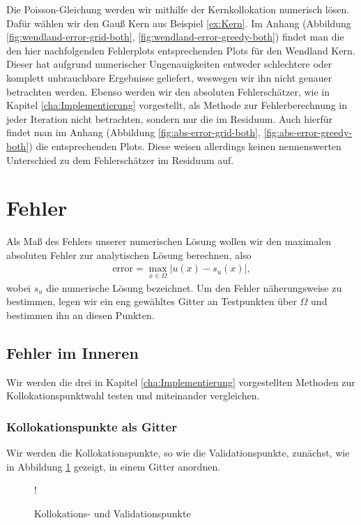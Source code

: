 Die Poisson-Gleichung werden wir mithilfe der Kernkollokation numerisch lösen. Dafür wählen wir den Gauß Kern aus Beispiel \ref{ex:Kern}. Im Anhang (Abbildung \ref{fig:wendland-error-grid-both}, \ref{fig:wendland-error-greedy-both}) findet man die den hier nachfolgenden Fehlerplots entsprechenden Plots für den Wendland Kern. Dieser hat aufgrund numerischer Ungenauigkeiten entweder schlechtere oder komplett unbrauchbare Ergebnisse geliefert, weswegen wir ihn nicht genauer betrachten werden. Ebenso werden wir den absoluten Fehlerschätzer, wie in Kapitel \ref{cha:Implementierung} vorgestellt, als Methode zur Fehlerberechnung in jeder Iteration nicht betrachten, sondern nur die im Residuum. Auch hierfür findet man im Anhang (Abbildung \ref{fig:abs-error-grid-both}, \ref{fig:abs-error-greedy-both}) die entsprechenden Plots. Diese weisen allerdings keinen nennenswerten Unterschied zu dem Fehlerschätzer im Residuum auf.

\section{Fehler}

Als Maß des Fehlers unserer numerischen Lösung wollen wir den maximalen absoluten Fehler zur analytischen Lösung berechnen, also
\begin{align*}
\text{error} = \max_{x \in \Omega} |u(x) - s_u (x)|,
\end{align*}
wobei $s_u$ die numerische Lösung bezeichnet. Um den Fehler näherungsweise zu bestimmen, legen wir ein eng gewähltes Gitter an Testpunkten über $\Omega$ und bestimmen ihn an diesen Punkten.
\subsection{Fehler im Inneren}

Wir werden die drei in Kapitel \ref{cha:Implementierung} vorgestellten Methoden zur Kollokationspunktwahl testen und miteinander vergleichen. 

\subsubsection{Kollokationspunkte als Gitter}
Wir werden die Kollokationspunkte, so wie die Validationspunkte, zunächst, wie in Abbildung \ref{fig:Kollok} gezeigt, in einem Gitter anordnen.
\begin{figure}[ht]
\centering
\resizebox {.6\columnwidth} {!} {

}
\caption{Kollokations- und Validationspunkte}
\label{fig:Kollok}
\end{figure}

